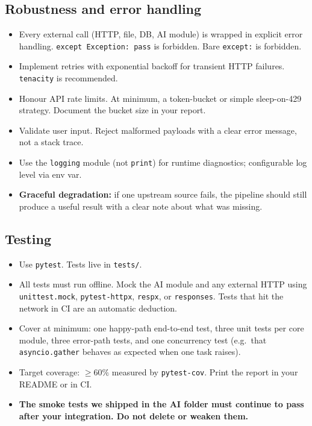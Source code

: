 \documentclass[11pt,a4paper]{article}
\newcommand{\warn}[1]{\textcolor{accent2}{\textbf{#1}}}
\begin{document}
\subsection{Robustness and error handling}
\begin{itemize}[topsep=2pt,itemsep=1pt]
  \item Every external call (HTTP, file, DB, AI module) is wrapped in explicit error handling. \texttt{except Exception: pass} is forbidden. Bare \texttt{except:} is forbidden.
  \item Implement retries with exponential backoff for transient HTTP failures. \texttt{tenacity} is recommended.
  \item Honour API rate limits. At minimum, a token-bucket or simple sleep-on-429 strategy. Document the bucket size in your report.
  \item Validate user input. Reject malformed payloads with a clear error message, not a stack trace.
  \item Use the \texttt{logging} module (not \texttt{print}) for runtime diagnostics; configurable log level via env var.
  \item \textbf{Graceful degradation:} if one upstream source fails, the pipeline should still produce a useful result with a clear note about what was missing.
\end{itemize}

\subsection{Testing}
\begin{itemize}[topsep=2pt,itemsep=1pt]
  \item Use \texttt{pytest}. Tests live in \texttt{tests/}.
  \item All tests must run offline. Mock the AI module and any external HTTP using \texttt{unittest.mock}, \texttt{pytest-httpx}, \texttt{respx}, or \texttt{responses}. Tests that hit the network in CI are an automatic deduction.
  \item Cover at minimum: one happy-path end-to-end test, three unit tests per core module, three error-path tests, and one concurrency test (e.g.\ that \texttt{asyncio.gather} behaves as expected when one task raises).
  \item Target coverage: $\ge 60\%$ measured by \texttt{pytest-cov}. Print the report in your README or in CI.
  \item \warn{The smoke tests we shipped in the AI folder must continue to pass after your integration. Do not delete or weaken them.}
\end{itemize}
\end{document}

